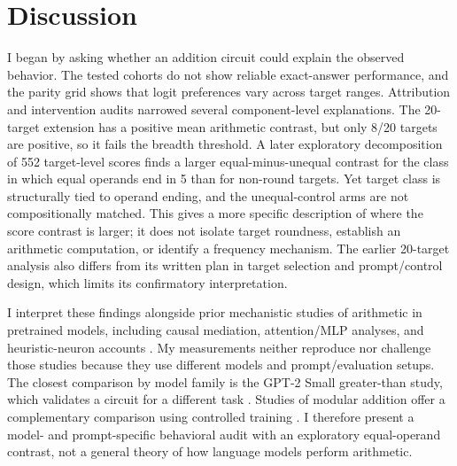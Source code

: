\documentclass[11pt]{article}
\begin{document}
\section{Discussion}

I began by asking whether an addition circuit could explain the observed behavior. The tested cohorts do not show reliable exact-answer performance, and the parity grid shows that logit preferences vary across target ranges. Attribution and intervention audits narrowed several component-level explanations. The 20-target extension has a positive mean arithmetic contrast, but only 8/20 targets are positive, so it fails the breadth threshold. A later exploratory decomposition of 552 target-level scores finds a larger equal-minus-unequal contrast for the class in which equal operands end in 5 than for non-round targets. Yet target class is structurally tied to operand ending, and the unequal-control arms are not compositionally matched. This gives a more specific description of where the score contrast is larger; it does not isolate target roundness, establish an arithmetic computation, or identify a frequency mechanism. The earlier 20-target analysis also differs from its written plan in target selection and prompt/control design, which limits its confirmatory interpretation.

I interpret these findings alongside prior mechanistic studies of arithmetic in pretrained models, including causal mediation, attention/MLP analyses, and heuristic-neuron accounts \cite{stolfo2023causal,yu2024cna,nikankin2025heuristics}. My measurements neither reproduce nor challenge those studies because they use different models and prompt/evaluation setups. The closest comparison by model family is the GPT-2 Small greater-than study, which validates a circuit for a different task \cite{hanna2023greater}. Studies of modular addition offer a complementary comparison using controlled training \cite{nanda2023progress,zhong2023clock}. I therefore present a model- and prompt-specific behavioral audit with an exploratory equal-operand contrast, not a general theory of how language models perform arithmetic.
\end{document}
